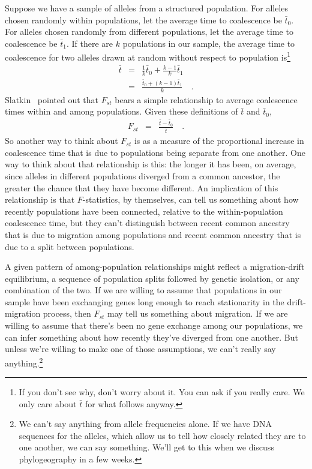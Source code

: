 \documentclass[12pt]{article}
\begin{document}
Suppose we have a sample of alleles from a structured population. For
alleles chosen randomly within populations, let the average time to
coalescence be $\bar t_0$. For alleles chosen randomly from different
populations, let the average time to coalescence be $\bar t_1$. If
there are $k$ populations in our sample, the average time to
coalescence for two alleles drawn at random without respect to
population is\footnote{If you don't see why, don't worry about it. You
can ask if you really care. We only care about $\bar t$ for what
follows anyway.}
\begin{eqnarray*}
  \bar t &=& \frac{1}{k}\bar t_0 + \frac{k-1}{k}\bar t_1 \\
  &=& \frac{\bar t_0 + (k-1)\bar t_1}
              {k} \quad .
\end{eqnarray*}
Slatkin~\cite{Slatkin-1991} pointed out that $F_{st}$ bears a simple
relationship to average coalescence times within and among
populations. Given these definitions of $\bar t$ and $\bar t_0$,
\begin{eqnarray*}
  F_{st} &=& \frac{\bar t - \bar t_0}{\bar t} \quad .
\end{eqnarray*}
So another way to think about $F_{st}$ is as a measure of the
proportional increase in coalescence time that is due to populations
being separate from one another. One way to think about that
relationship is this: the longer it has been, on average, since
alleles in different populations diverged from a common ancestor, the
greater the chance that they have become different. An implication of
this relationship is that $F$-statistics, by themselves, can tell us
something about how recently populations have been connected, relative
to the within-population coalescence time, but they can't distinguish
between recent common ancestry that is due to migration among
populations and recent common ancestry that is due to a split between
populations.

A given pattern of among-population relationships might reflect a
migration-drift equilibrium, a sequence of population splits followed
by genetic isolation, or any combination of the two. If we are willing
to assume that populations in our sample have been exchanging genes
long enough to reach stationarity in the drift-migration process, then
$F_{st}$ may tell us something about migration. If we are willing to
assume that there's been no gene exchange among our populations, we
can infer something about how recently they've diverged from one
another. But unless we're willing to make one of those assumptions, we
can't really say anything.\footnote{We can't say anything from allele
  frequencies alone. If we have DNA sequences for the alleles, which
  allow us to tell how closely related they are to one another, we
  can say something. We'll get to this when we discuss phylogeography
  in a few weeks.}
\end{document}
